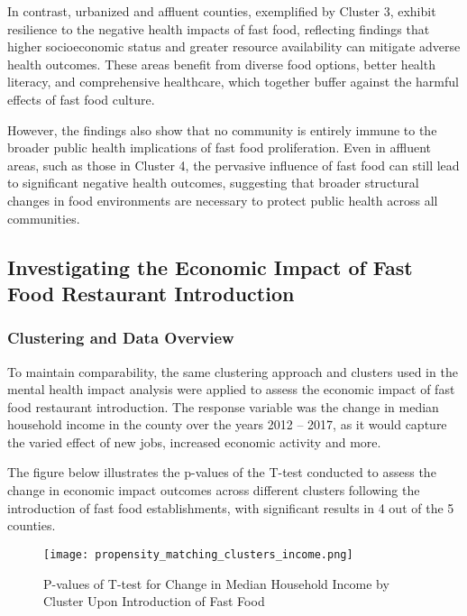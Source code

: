 \documentclass[letterpaper, 11pt]{report}
\begin{document}
In contrast, urbanized and affluent counties, exemplified by Cluster 3, exhibit resilience to the negative health impacts of fast food, reflecting findings that higher socioeconomic status and greater resource availability can mitigate adverse health outcomes. These areas benefit from diverse food options, better health literacy, and comprehensive healthcare, which together buffer against the harmful effects of fast food culture.

However, the findings also show that no community is entirely immune to the broader public health implications of fast food proliferation. Even in affluent areas, such as those in Cluster 4, the pervasive influence of fast food can still lead to significant negative health outcomes, suggesting that broader structural changes in food environments are necessary to protect public health across all communities.


\subsection{Investigating the Economic Impact of Fast Food Restaurant Introduction}

\subsubsection{Clustering and Data Overview}
To maintain comparability, the same clustering approach and clusters used in the mental health impact analysis were applied to assess the economic impact of fast food restaurant introduction. The response variable was the change in median household income in the county over the years 2012 – 2017, as it would capture the varied effect of new jobs, increased economic activity and more.

\noindent The figure below illustrates the p-values of the T-test conducted to assess the change in economic impact outcomes across different clusters following the introduction of fast food establishments, with significant results in 4 out of the 5 counties.

\begin{figure}[h!]
    \centering
    \texttt{[image: propensity\_matching\_clusters\_income.png]}
    \caption{P-values of T-test for Change in Median Household Income by Cluster Upon Introduction of Fast Food}
    \label{fig:mental_health_pvalues}
\end{figure}
\end{document}
